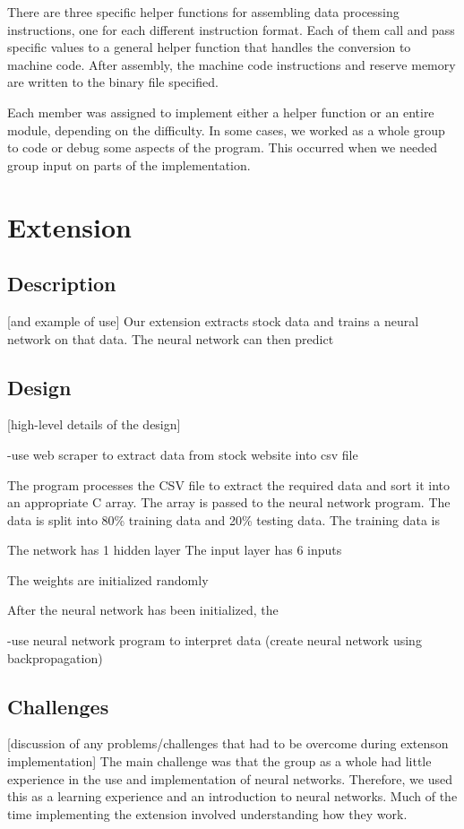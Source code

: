 \documentclass[11pt]{article}
\begin{document}
There are three specific helper functions for assembling data processing instructions,
one for each different instruction format.
Each of them call and pass specific values to a general helper function that handles 
the conversion to machine code. 
After assembly, the machine code instructions and reserve memory are written to the binary file specified.

Each member was assigned to implement either a helper function or an entire module, depending on the difficulty.
In some cases, we worked as a whole group to code or debug some aspects of the program.
This occurred when we needed group input on parts of the implementation. 

\newpage

\section{Extension}
\subsection{Description}
[and example of use]
Our extension extracts stock data and trains a neural network on that data.
The neural network can then predict 


\subsection{Design}
[high-level details of the design]

-use web scraper to extract data from stock website into csv file

The program processes the CSV file to extract the required data and sort it into an appropriate C array.
The array is passed to the neural network program.
The data is split into 80\% training data and 20\% testing data.
The training data is 

The network has 1 hidden layer 
The input layer has 6 inputs

The weights are initialized randomly

After the neural network has been initialized, the 

-use neural network program to interpret data (create neural network using backpropagation)


\subsection{Challenges}
[discussion of any problems/challenges that had to be overcome during extenson implementation]
The main challenge was that the group as a whole had little experience in the use and implementation of neural networks. 
Therefore, we used this as a learning experience and an introduction to neural networks. 
Much of the time implementing the extension involved understanding how they work.
\end{document}
